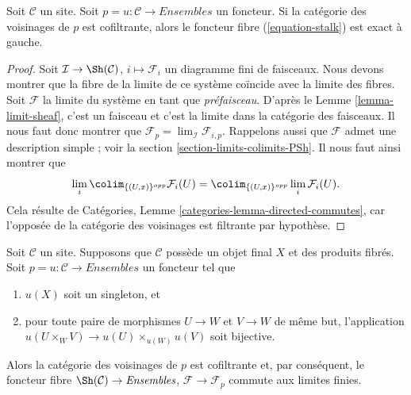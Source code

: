 \begin{lemma}
\label{lemma-neighbourhoods-cofiltered}
Soit $\mathcal{C}$ un site. Soit $p = u : \mathcal{C} \to \textit{Ensembles}$
un foncteur. Si la catégorie des voisinages de $p$ est
cofiltrante, alors le foncteur fibre (\ref{equation-stalk})
est exact à gauche.
\end{lemma}

\begin{proof}
Soit $\mathcal{I} \to \Sh(\mathcal{C})$,
$i \mapsto \mathcal{F}_i$ un diagramme fini de faisceaux.
Nous devons montrer que la fibre de la limite de ce
système coïncide avec la limite des fibres.
Soit $\mathcal{F}$ la limite du système en tant que {\it préfaisceau}.
D’après le Lemme \ref{lemma-limit-sheaf}, c’est un faisceau et
c’est la limite dans la catégorie des faisceaux.
Il nous faut donc montrer que
$\mathcal{F}_p = \lim_\mathcal{I} \mathcal{F}_{i, p}$.
Rappelons aussi que $\mathcal{F}$ admet une description simple ; voir la
section \ref{section-limits-colimits-PSh}. Il nous faut ainsi montrer que
$$
\lim_i \colim_{\{(U, x)\}^{opp}} \mathcal{F}_i(U)
=
\colim_{\{(U, x)\}^{opp}} \lim_i \mathcal{F}_i(U).
$$
Cela résulte de Catégories, Lemme \ref{categories-lemma-directed-commutes},
car l’opposée de la catégorie des voisinages est filtrante
par hypothèse.
\end{proof}

\begin{lemma}
\label{lemma-neighbourhoods-directed}
Soit $\mathcal{C}$ un site. Supposons que $\mathcal{C}$ possède
un objet final $X$ et des produits fibrés.
Soit $p = u : \mathcal{C} \to \textit{Ensembles}$ un foncteur tel que
\begin{enumerate}
\item $u(X)$ soit un singleton, et
\item pour toute paire de morphismes $U \to W$ et $V \to W$ de
même but, l’application
$u(U \times_W V) \to u(U) \times_{u(W)} u(V)$ soit bijective.
\end{enumerate}
Alors la catégorie des voisinages de $p$ est cofiltrante
et, par conséquent, le foncteur fibre $\Sh(\mathcal{C}) \to \textit{Ensembles}$,
$\mathcal{F} \to \mathcal{F}_p$ commute aux limites finies.
\end{lemma}

